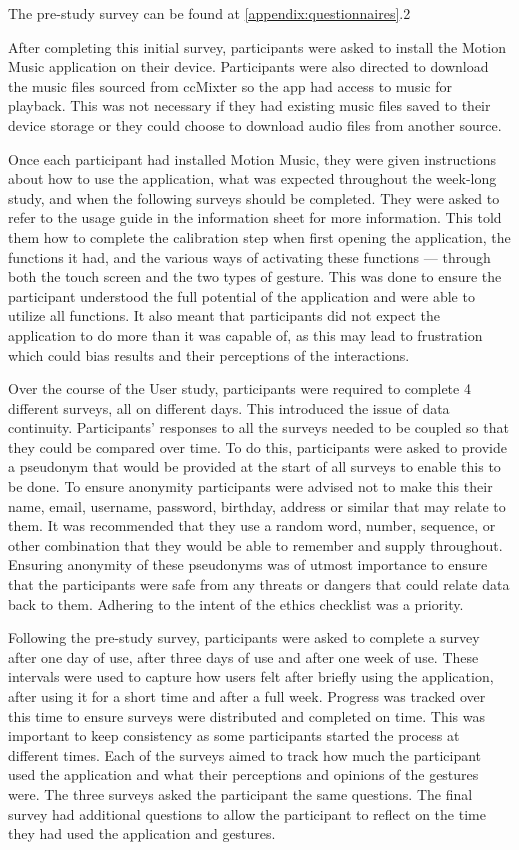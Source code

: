 \documentclass{l4proj}
\begin{document}
The pre-study  survey can be found at \autoref{appendix:questionnaires}.2


After completing this initial survey, participants were asked to install the Motion Music application on their device. Participants were also directed to download the music files sourced from ccMixter so the app had access to music for playback. This was not necessary if they had existing music files saved to their device storage or they could choose to download audio files from another source.

Once each participant had installed Motion Music, they were given instructions about how to use the application, what was expected throughout the week-long study, and when the following surveys should be completed. They were asked to refer to the usage guide in the information sheet for more information. This told them how to complete the calibration step when first opening the application, the functions it had, and the various ways of activating these functions --- through both the touch screen and the two types of gesture. This was done to ensure the participant understood the full potential of the application and were able to utilize all functions. It also meant that participants did not expect the application to do more than it was capable of, as this may lead to frustration which could bias results and their perceptions of the interactions.

Over the course of the User study, participants were required to complete 4 different surveys, all on different days. This introduced the issue of data continuity. Participants' responses to all the surveys needed to be coupled so that they could be compared over time. To do this, participants were asked to provide a pseudonym that would be provided at the start of all surveys to enable this to be done. To ensure anonymity participants were advised not to make this their name, email, username, password, birthday, address or similar that may relate to them. It was recommended that they use a random word, number, sequence, or other combination that they would be able to remember and supply throughout. Ensuring anonymity of these pseudonyms was of utmost importance to ensure that the participants were safe from any threats or dangers that could relate data back to them. Adhering to the intent of the ethics checklist was a priority. 

Following the pre-study survey, participants were asked to complete a survey after one day of use, after three days of use and after one week of use. These intervals were used to capture how users felt after briefly using the application, after using it for a short time and after a full week. Progress was tracked over this time to ensure surveys were distributed and completed on time. This was important to keep consistency as some participants started the process at different times. Each of the surveys aimed to track how much the participant used the application and what their perceptions and opinions of the gestures were. The three surveys asked the participant the same questions. The final survey had additional questions to allow the participant to reflect on the time they had used the application and gestures.
\end{document}
